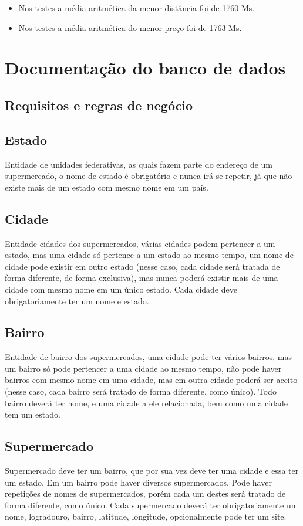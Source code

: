 \begin{itemize}
\item Nos testes a média aritmética da menor distância foi de 1760 Ms.
\item Nos testes a média aritmética do menor preço foi de 1763 Ms.
\end{itemize}


\section{Documentação do banco de dados}
\subsection{Requisitos e regras de negócio}

\subsection{Estado}
	Entidade de unidades federativas, as quais fazem parte do endereço de um supermercado, o nome de estado é obrigatório e nunca irá se repetir, já que não existe mais de um estado com mesmo nome em um país.
	
\subsection{Cidade}
	Entidade cidades dos supermercados, várias cidades podem pertencer a um estado, mas uma cidade só pertence a um estado ao mesmo tempo, um nome de cidade pode existir em outro estado (nesse caso, cada cidade será tratada de forma diferente, de forma exclusiva), mas nunca poderá existir mais de uma cidade com mesmo nome em um único estado. Cada cidade deve obrigatoriamente ter um nome e estado.

\subsection{Bairro}
	Entidade de bairro dos supermercados, uma cidade pode ter vários bairros, mas um bairro só pode pertencer a uma cidade ao mesmo tempo, não pode haver bairros com mesmo nome em uma cidade, mas em outra cidade poderá ser aceito (nesse caso, cada bairro será tratado de forma diferente, como único). Todo bairro deverá ter nome, e uma cidade a ele relacionada, bem como uma cidade tem um estado. 

\subsection{Supermercado}
	Supermercado deve ter um bairro, que por sua vez deve ter uma cidade e essa ter um estado. Em um bairro pode haver diversos supermercados. Pode haver repetições de nomes de supermercados, porém cada um destes será tratado de forma diferente, como único. Cada supermercado deverá ter obrigatoriamente um nome, logradouro, bairro, latitude, longitude, opcionalmente pode ter um site.

